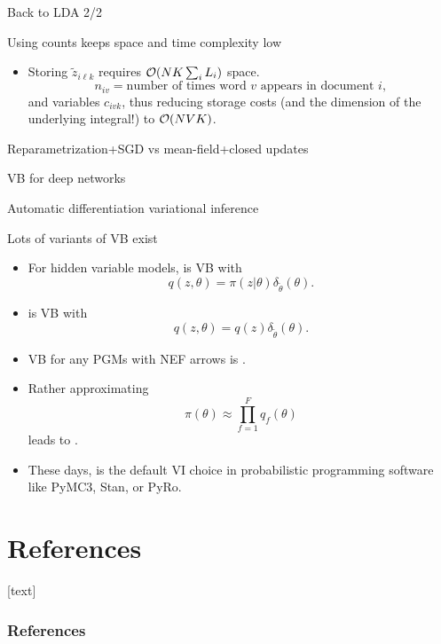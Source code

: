 \documentclass[10pt]{beamer}
\begin{document}
\begin{frame}{Back to LDA 2/2}

\end{frame}


\begin{frame}{Using counts keeps space and time complexity low}
\begin{itemize}
  \item Storing $\tilde z_{i\ell k}$ requires $\mathcal{O} (N K\sum_i L_i )$ space. 
  $$
  n_{iv} = \text{number of times word $v$ appears in document $i$},
  $$
  and variables $c_{ivk}$, thus reducing storage costs (and the dimension of the underlying integral!) to $\mathcal{O}(NVK)$.
\blank
\end{itemize}
\end{frame}

\begin{frame}{Reparametrization+SGD vs mean-field+closed updates}
  \vfill
  \blank
\end{frame}

\begin{frame}{VB for deep networks}
  \vfill
  \blank
\end{frame}

\begin{frame}{Automatic differentiation variational inference  \citep{KTRGB17}}
  \vfill
  \blank
  \end{frame}

\begin{frame}{Lots of variants of VB exist \citep{Mur12}}
  \begin{itemize}
    \item For hidden variable models,  is VB with $$q(z,\theta) = \pi(z\vert \theta)\delta_{\tilde\theta}(\theta).$$
    \item {} is VB with $$q(z,\theta) = q(z)\delta_{\tilde\theta}(\theta).$$
    \item VB for any PGMs with NEF arrows is .
    \item Rather approximating $$\pi(\theta) \approx \prod_{f=1}^F q_f(\theta)$$ leads to .
    \item These days,  is the default VI choice in probabilistic programming software like PyMC3, Stan, or PyRo.
  \end{itemize}
\end{frame}

\section*{References}
[text]%
\begin{frame}[allowframebreaks]
\frametitle{References}
\small
\printbibliography
\normalsize
\end{frame}
\end{document}

